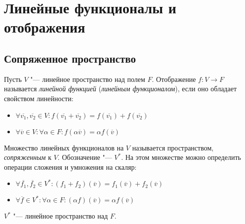 \section{Линейные функционалы и отображения}

\subsection{Сопряженное пространство}

\begin{definition}
	Пусть $V$ "--- линейное пространство над полем $F$. Отображение $f : V \rightarrow F$ называется \textit{линейной функцией} (\textit{линейным функционалом}), если оно обладает свойством линейности:
	\begin{itemize}
		\item $\forall \overline{v_1}, \overline{v_2} \in V: f(\overline{v_1} + \overline{v_2}) = f(\overline{v_1}) + f(\overline{v_2})$
		\item $\forall \overline{v} \in V: \forall \alpha \in F: f(\alpha\overline{v}) = \alpha f(\overline{v})$
	\end{itemize}
\end{definition}

\begin{definition}
	Множество линейных функционалов на $V$ называется пространством, \textit{сопряженным} к $V$. Обозначение "--- $V^*$. На этом множестве можно определить операции сложения и умножения на скаляр:
	\begin{itemize}
		\item $\forall \overline{f_1}, \overline{f_2} \in V^*: (f_1 + f_2)(\overline{v}) = f_1(\overline{v}) + f_2(\overline{v})$
		\item $\forall \overline{f} \in V^*: \forall \alpha \in F: (\alpha f)(\overline{v}) = \alpha f(\overline{v})$
	\end{itemize}
\end{definition}

\begin{proposition}
	$V^*$ "--- линейное пространство над $F$.
\end{proposition}

